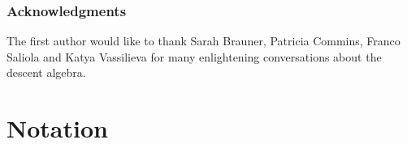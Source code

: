 \documentclass[12pt]{article}
\theoremstyle{definition}%
\theoremstyle{definition}%
\theoremstyle{remark}%
\newcommand{\tup}[1]{\left( #1 \right)}
\newcommand{\set}[1]{\left\{ #1 \right\}}
\newcommand{\kk}{\mathbf{k}}
\newcommand{\ksn}{\kk\left[S_n\right]}
\newcommand{\kf}{\kk\mathcal{F}}
\newcommand{\kfsn}{\left(\kf\right)^{S_n}}
\newcommand{\dsn}{D\left(S_n\right)}
\newcommand{\A}{\mathbf{A}}
\newcommand{\BB}{\mathbf{B}}
\newcommand{\BBa}{\mathbf{B}_{\alpha}}
\newcommand{\BBta}{\widetilde{\mathbf{B}}_{\alpha}}
\newcommand{\CF}{\mathcal{F}}
\newcommand{\wo}{w_0} %
\newcommand{\wotil}{\widetilde{w}_0}
\newcommand{\na}{n_{ \alpha } }%
\newcommand{\Des}{\operatorname{Des}}
\newcommand{\defin}[1]{\textbf{#1}}
\begin{document}
%

\subsubsection*{Acknowledgments}

The first author would like to thank Sarah Brauner, Patricia Commins, Franco Saliola and Katya Vassilieva for many enlightening conversations about the descent algebra.


\section{\label{sec.not}Notation}
\end{document}
